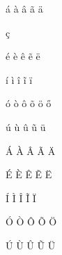 \documentclass[12pt,a4paper]{article}
\begin{document}
\'{a}
\`{a}
\^{a}
\~{a}
\"{a}

\c{c}

\'{e}
\`{e}
\^{e}
\~{e}
\"{e}

\'{i}
\`{i}
\^{i}
\~{i}
\"{i}

\'{o}
\`{o}
\^{o}
\~{o}
\"{o}
\H{o}

\'{u}
\`{u}
\^{u}
\~{u}
\"{u}

\'{A}
\`{A}
\^{A}
\~{A}
\"{A}

\'{E}
\`{E}
\^{E}
\~{E}
\"{E}

\'{I}
\`{I}
\^{I}
\~{I}
\"{I}

\'{O}
\`{O}
\^{O}
\~{O}
\"{O}

\'{U}
\`{U}
\^{U}
\~{U}
\"{U}
\end{document}
